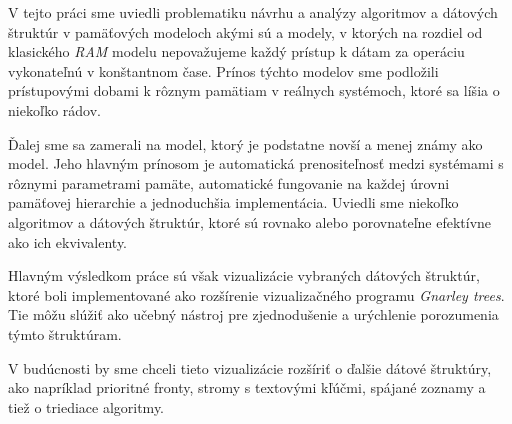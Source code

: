 V tejto práci sme uviedli problematiku návrhu a analýzy algoritmov a dátových štruktúr v pamäťových modeloch akými sú \aware a \obliv modely, v ktorých na rozdiel od klasického \emph{RAM} modelu nepovažujeme každý prístup k dátam za operáciu vykonateľnú v konštantnom čase. Prínos týchto modelov sme podložili prístupovými dobami k rôznym pamätiam v reálnych systémoch, ktoré sa líšia o niekoľko rádov.

Ďalej sme sa zamerali na \obliv model, ktorý je podstatne novší a menej známy ako \aware model. Jeho hlavným prínosom je automatická prenositeľnosť medzi systémami s rôznymi parametrami pamäte, automatické fungovanie na každej úrovni pamäťovej hierarchie a jednoduchšia implementácia. Uviedli sme niekoľko \obliv algoritmov a dátových štruktúr, ktoré sú rovnako alebo porovnateľne efektívne ako ich \aware ekvivalenty.

Hlavným výsledkom práce sú však vizualizácie vybraných \obliv dátových štruktúr, ktoré boli implementované ako rozšírenie vizualizačného programu \emph{Gnarley trees}. Tie môžu slúžiť ako učebný nástroj pre zjednodušenie a urýchlenie porozumenia týmto štruktúram.

V budúcnosti by sme chceli tieto vizualizácie rozšíriť o ďalšie \obliv dátové štruktúry, ako napríklad prioritné fronty, stromy s textovými kľúčmi, spájané zoznamy a tiež o \obliv triediace algoritmy.